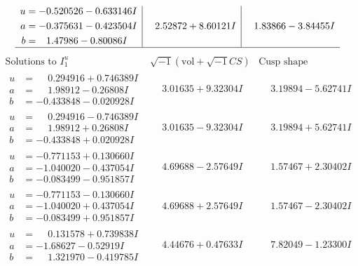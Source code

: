 \documentclass[1p]{elsarticle_modified}
\theoremstyle{definition}
\newcommand{\I}{\sqrt{-1}}
\begin{document}
$$\begin{array}{c|c|c}
\begin{aligned}
u &= -0.520526 - 0.633146 I \\
a &= -0.375631 - 0.423504 I \\
b &= \phantom{-}1.47986 - 0.80086 I\end{aligned}
 & \phantom{-}2.52872 + 8.60121 I & \phantom{-}1.83866 - 3.84455 I\\
 \hline 
 \end{array}$$\newpage$$\begin{array}{c|c|c}  
\text{Solutions to }I^u_{1}& \I (\text{vol} + \sqrt{-1}CS) & \text{Cusp shape}\\
 \hline 
\begin{aligned}
u &= \phantom{-}0.294916 + 0.746389 I \\
a &= \phantom{-}1.98912 - 0.26808 I \\
b &= -0.433848 - 0.020928 I\end{aligned}
 & \phantom{-}3.01635 + 9.32304 I & \phantom{-}3.19894 - 5.62741 I \\ \hline\begin{aligned}
u &= \phantom{-}0.294916 - 0.746389 I \\
a &= \phantom{-}1.98912 + 0.26808 I \\
b &= -0.433848 + 0.020928 I\end{aligned}
 & \phantom{-}3.01635 - 9.32304 I & \phantom{-}3.19894 + 5.62741 I \\ \hline\begin{aligned}
u &= -0.771153 + 0.130660 I \\
a &= -1.040020 - 0.437054 I \\
b &= -0.083499 - 0.951857 I\end{aligned}
 & \phantom{-}4.69688 - 2.57649 I & \phantom{-}1.57467 + 2.30402 I \\ \hline\begin{aligned}
u &= -0.771153 - 0.130660 I \\
a &= -1.040020 + 0.437054 I \\
b &= -0.083499 + 0.951857 I\end{aligned}
 & \phantom{-}4.69688 + 2.57649 I & \phantom{-}1.57467 - 2.30402 I \\ \hline\begin{aligned}
u &= \phantom{-}0.131578 + 0.739838 I \\
a &= -1.68627 - 0.52919 I \\
b &= \phantom{-}1.321970 - 0.419785 I\end{aligned}
 & \phantom{-}4.44676 + 0.47633 I & \phantom{-}7.82049 - 1.23300 I \\ \hline\begin{aligned}

\end{aligned}
\end{array}$$
\end{document}
